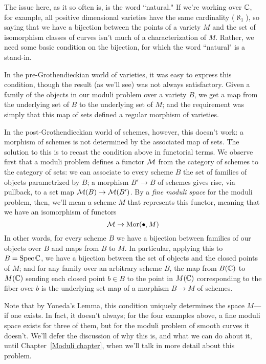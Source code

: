 The issue here, as it so often is,  is the word ``natural." If we're working over $\CC$, for example, all positive dimensional varieties have the same cardinality ($\aleph_1$), so saying that we have a bijection between the points of a variety $M$ and the set of isomorphism classes of curves isn't much of a characterization of $M$. Rather, we need some basic condition on the bijection, for which the word ``natural" is a stand-in. 

In the pre-Grothendieckian world of varieties, it was easy to express this condition, though the result (as we'll see) was not always satisfactory. Given a family of the objects in our moduli problem over a variety $B$, we get a map from the underlying set of $B$ to the underlying set of $M$; and the requirement was simply that this map of sets defined a regular morphism of varieties.

In the post-Grothendieckian world of schemes, however, this doesn't work: a morphism of schemes is not determined by the associated map of sets. The solution to this is to recast the condition above in functorial terms. We observe first that a moduli problem defines a functor $\cM$ from the category of schemes to the category of sets: we can associate to every scheme $B$ the set of families of objects parametrized by $B$; a morphism $B' \to B$ of schemes gives rise, via pullback, to a set map $\cM(B) \to \cM(B')$. By a \emph{fine moduli space} for the moduli problem, then, we'll mean a scheme $M$ that represents this functor, meaning that we have an isomorphism of functors
$$
\cM \to {\rm Mor}(\bullet, M)
$$
In other words, for every scheme $B$ we have a bijection between families of our objects over $B$ and maps from $B$ to $M$. In particular, applying this to $B = \Spec \CC$, we have a bijection between the set of objects and the closed points of $M$; and for any family over an arbitrary scheme $B$, the map from $B(\CC)$ to $M(\CC)$ sending each closed point  $b \in B$ to the point in $M(\CC)$ corresponding to the fiber over $b$ is the underlying set map of a morphism $B \to M$ of schemes.

Note that by Yoneda's Lemma, this condition uniquely determines the space $M$---if one exists. In fact, it doesn't always; for the four examples above, a fine moduli space exists for three of them, but for the moduli problem of smooth curves it doesn't. We'll defer the discussion of why this is, and what we can do about it, until Chapter~\ref{Moduli chapter}, when we'll talk in more detail about this problem.

